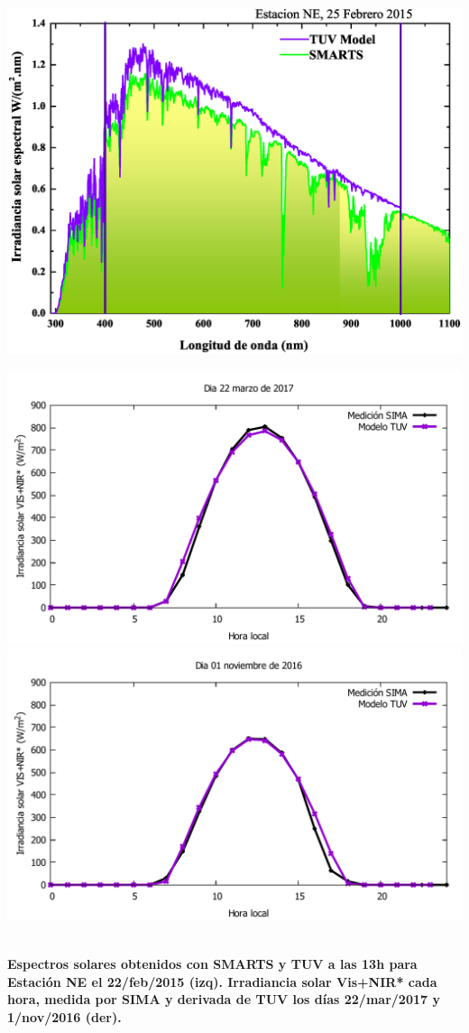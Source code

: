 \documentclass{article}
\begin{document}
\begin{minipage}{0.53\linewidth}
\begin{minipage}{0.6\linewidth}
\includegraphics[scale=0.33]{images/espectro.eps}
\end{minipage}
\hspace{-0.4cm}
\begin{minipage}{0.4\linewidth}
\includegraphics[scale=0.32]{images/med1.pdf}\\
\includegraphics[scale=0.32]{images/med2.pdf}
\end{minipage}\\
\textbf{\textcolor{ver}{
Espectros solares obtenidos con SMARTS y TUV a las 13h para Estación NE el 22/feb/2015 (izq). Irradiancia solar Vis+NIR* cada hora, medida por SIMA y derivada de TUV los días 22/mar/2017 y 1/nov/2016 (der).}}
\end{minipage}
\end{document}
